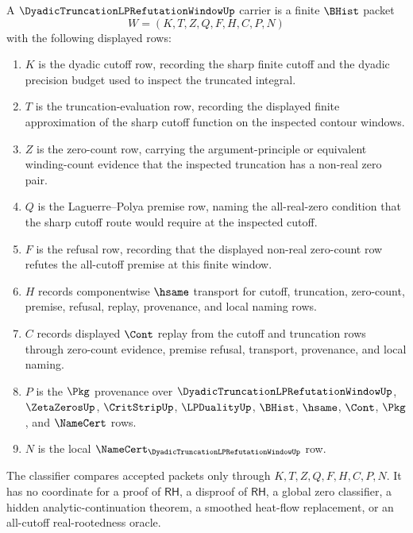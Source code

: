 \begin{definition}
\label{def:dyadic-truncation-lp-refutation-window-carrier}
A $\DyadicTruncationLPRefutationWindowUp$ carrier is a finite $\BHist$ packet
$$
W=(K,T,Z,Q,F,H,C,P,N)
$$
with the following displayed rows:
\begin{enumerate}
\item $K$ is the dyadic cutoff row, recording the sharp finite cutoff and the dyadic precision budget used to inspect the truncated integral.
\item $T$ is the truncation-evaluation row, recording the displayed finite approximation of the sharp cutoff function on the inspected contour windows.
\item $Z$ is the zero-count row, carrying the argument-principle or equivalent winding-count evidence that the inspected truncation has a non-real zero pair.
\item $Q$ is the Laguerre--Polya premise row, naming the all-real-zero condition that the sharp cutoff route would require at the inspected cutoff.
\item $F$ is the refusal row, recording that the displayed non-real zero-count row refutes the all-cutoff premise at this finite window.
\item $H$ records componentwise $\hsame$ transport for cutoff, truncation, zero-count, premise, refusal, replay, provenance, and local naming rows.
\item $C$ records displayed $\Cont$ replay from the cutoff and truncation rows through zero-count evidence, premise refusal, transport, provenance, and local naming.
\item $P$ is the $\Pkg$ provenance over $\DyadicTruncationLPRefutationWindowUp$, $\ZetaZerosUp$, $\CritStripUp$, $\LPDualityUp$, $\BHist$, $\hsame$, $\Cont$, $\Pkg$, and $\NameCert$ rows.
\item $N$ is the local $\NameCert_{\DyadicTruncationLPRefutationWindowUp}$ row.
\end{enumerate}
The classifier compares accepted packets only through $K,T,Z,Q,F,H,C,P,N$. It has no coordinate for a proof of $\mathsf{RH}$, a disproof of $\mathsf{RH}$, a global zero classifier, a hidden analytic-continuation theorem, a smoothed heat-flow replacement, or an all-cutoff real-rootedness oracle.
\end{definition}

